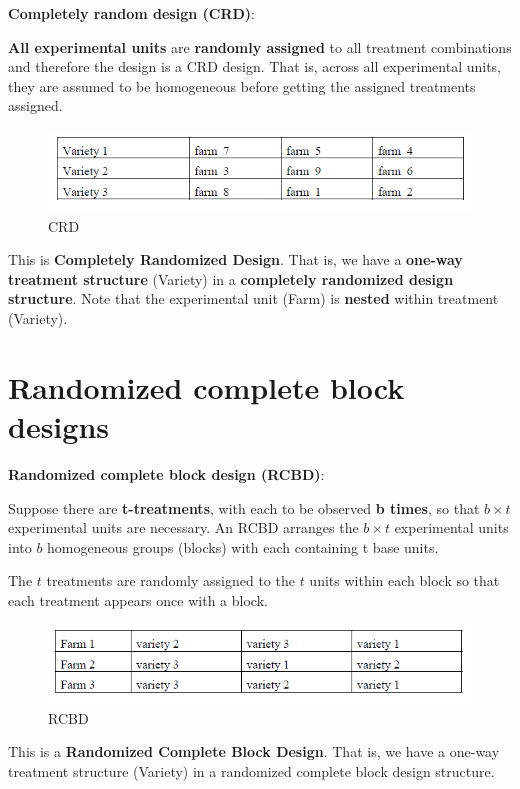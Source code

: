 \documentclass[]{book}
\begin{document}
\textbf{Completely random design (CRD)}:

\textbf{All experimental units} are \textbf{randomly assigned} to all treatment combinations and therefore the design is a CRD design. That is, across all experimental units, they are assumed to be homogeneous before getting the assigned treatments assigned.

\begin{figure}
\centering
\includegraphics{CRD.png}
\caption{CRD}
\end{figure}

This is \textbf{Completely Randomized Design}. That is, we have a \textbf{one-way treatment structure} (Variety) in a \textbf{completely randomized design structure}. Note that the experimental unit (Farm) is \textbf{nested} within treatment (Variety).

\hypertarget{randomized-complete-block-designs}{%
\section{Randomized complete block designs}\label{randomized-complete-block-designs}}

\textbf{Randomized complete block design (RCBD)}:

Suppose there are \textbf{t-treatments}, with each to be observed \textbf{b times}, so that \(b\times t\) experimental units are necessary. An RCBD arranges the \(b\times t\) experimental units into \(b\) homogeneous groups (blocks) with each containing t base units.

The \(t\) treatments are randomly assigned to the \(t\) units within each block so that each treatment appears once with a block.

\begin{figure}
\centering
\includegraphics{RCBD.png}
\caption{RCBD}
\end{figure}

This is a \textbf{Randomized Complete Block Design}. That is, we have a one-way treatment structure (Variety) in a randomized complete block design structure.
\end{document}
